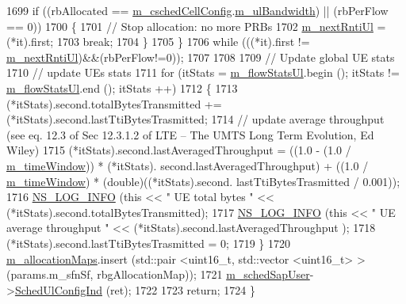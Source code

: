 \begin{DoxyCode}
1699       \textcolor{keywordflow}{if} ((rbAllocated == \hyperlink{classns3_1_1TdBetFfMacScheduler_a3e53aae0259501332769cd6ca4b74800}{m\_cschedCellConfig}.\hyperlink{structns3_1_1FfMacCschedSapProvider_1_1CschedCellConfigReqParameters_a5ab5b102878e6e7e7727a14af4a64d2f}{m\_ulBandwidth}) || (rbPerFlow ==
       0))
1700         \{
1701           \textcolor{comment}{// Stop allocation: no more PRBs}
1702           \hyperlink{classns3_1_1TdBetFfMacScheduler_affbc3b6450778e77fbc0e20cb575d1b0}{m\_nextRntiUl} = (*it).first;
1703           \textcolor{keywordflow}{break};
1704         \}
1705     \}
1706   \textcolor{keywordflow}{while} (((*it).first != \hyperlink{classns3_1_1TdBetFfMacScheduler_affbc3b6450778e77fbc0e20cb575d1b0}{m\_nextRntiUl})&&(rbPerFlow!=0));
1707 
1708 
1709   \textcolor{comment}{// Update global UE stats}
1710   \textcolor{comment}{// update UEs stats}
1711   \textcolor{keywordflow}{for} (itStats = \hyperlink{classns3_1_1TdBetFfMacScheduler_a192dacbea27307776249e60660fa005e}{m\_flowStatsUl}.begin (); itStats != \hyperlink{classns3_1_1TdBetFfMacScheduler_a192dacbea27307776249e60660fa005e}{m\_flowStatsUl}.end (); itStats
      ++)
1712     \{
1713       (*itStats).second.totalBytesTransmitted += (*itStats).second.lastTtiBytesTrasmitted;
1714       \textcolor{comment}{// update average throughput (see eq. 12.3 of Sec 12.3.1.2 of LTE – The UMTS Long Term Evolution, Ed
       Wiley)}
1715       (*itStats).second.lastAveragedThroughput = ((1.0 - (1.0 / \hyperlink{classns3_1_1TdBetFfMacScheduler_abedd8d532189797f7f33af0e2a49427e}{m\_timeWindow})) * (*itStats).
      second.lastAveragedThroughput) + ((1.0 / \hyperlink{classns3_1_1TdBetFfMacScheduler_abedd8d532189797f7f33af0e2a49427e}{m\_timeWindow}) * (double)((*itStats).second.
      lastTtiBytesTrasmitted / 0.001));
1716       \hyperlink{group__logging_gafbd73ee2cf9f26b319f49086d8e860fb}{NS\_LOG\_INFO} (\textcolor{keyword}{this} << \textcolor{stringliteral}{" UE total bytes "} << (*itStats).second.totalBytesTransmitted);
1717       \hyperlink{group__logging_gafbd73ee2cf9f26b319f49086d8e860fb}{NS\_LOG\_INFO} (\textcolor{keyword}{this} << \textcolor{stringliteral}{" UE average throughput "} << (*itStats).second.lastAveragedThroughput
      );
1718       (*itStats).second.lastTtiBytesTrasmitted = 0;
1719     \}
1720   \hyperlink{classns3_1_1TdBetFfMacScheduler_a058a5b7d1c7c507d3fe3d9d12cc24ab7}{m\_allocationMaps}.insert (std::pair <uint16\_t, std::vector <uint16\_t> > (params.m\_sfnSf, 
      rbgAllocationMap));
1721   \hyperlink{classns3_1_1TdBetFfMacScheduler_aac1731b516e0a6e45d76828f6c72eaa5}{m\_schedSapUser}->\hyperlink{classns3_1_1FfMacSchedSapUser_a1b89636256701a84d990db7db8aea874}{SchedUlConfigInd} (ret);
1722 
1723   \textcolor{keywordflow}{return};
1724 \}
\end{DoxyCode}


